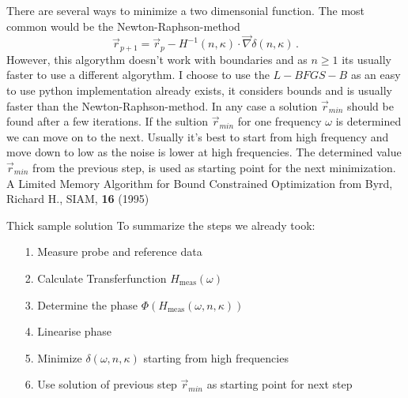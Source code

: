 \documentclass[aspectratio=1610, 9pt]{beamer}
\begin{document}
\begin{frame}
  There are several ways to minimize a two dimensonial function. The most common would be the Newton-Raphson-method
  \begin{equation}
    \vec{r}_{p + 1} = \vec{r}_{p} - H^{-1}(n,\kappa)\cdot\vec{\nabla}\delta(n, \kappa) \, .
  \end{equation}
  However, this algorythm doesn't work with boundaries and as $n \geq 1$ its usually faster to use a different algorythm.
  I choose to use the $L-BFGS-B$ as an easy to use python implementation already exists, it considers bounds and is usually faster than the Newton-Raphson-method.
  In any case a solution $\vec{r}_{min}$ should be found after a few iterations.
  If the sultion $\vec{r}_{min}$ for one frequency $\omega$ is determined  we can move on to the next.
  Usually it's best to start from high frequency and move down to low as the noise is lower at high frequencies.
  The determined value $\vec{r}_{min}$ from the previous step, is used as starting point for the next minimization.\\
  \textcolor{tugreen}{A Limited Memory Algorithm for Bound Constrained Optimization} from Byrd, Richard H., SIAM, \textbf{16} (1995)
\end{frame}

\begin{frame}{Thick sample solution}
  To summarize the steps we already took:
  \begin{itemize}
    \item[1.] Measure probe and reference data 
    \item[2.] Calculate Transferfunction $H_\text{meas}(\omega)$
    \item[3.] Determine the phase $\Phi(H_\text{meas}(\omega, n, \kappa))$
    \item[4.] Linearise phase
    \item[5.] Minimize $\delta(\omega, n, \kappa)$ starting from high frequencies
    \item[6.] Use solution of previous step $\vec{r}_{min}$ as starting point for next step 
  \end{itemize}
\end{frame}
\end{document}

